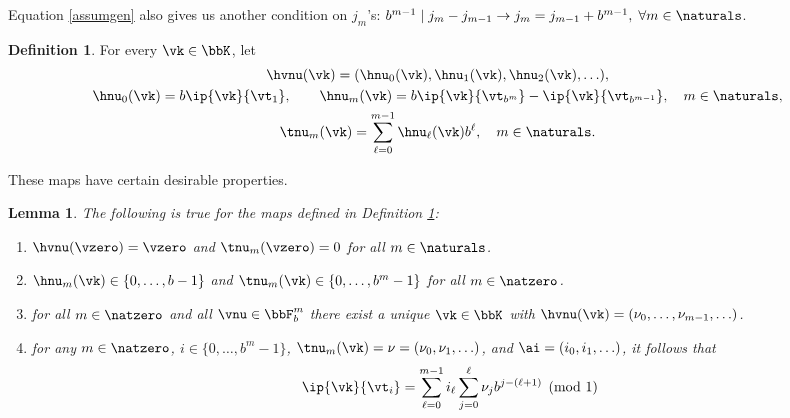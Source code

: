 \documentclass[]{elsarticle}
\newtheorem{lem}{Lemma}
\theoremstyle{definition}
\newtheorem{defin}{Definition}
\begin{document}
Equation \eqref{assumgen} also gives us another condition on $j_m$'s: $ b^{m-1} \mid j_m-j_{m-1}\rightarrow j_m=j_{m-1}+b^{m-1},\;\forall m\in\naturals$.

\begin{defin} \label{numapdef} For every $\vk \in \bbK$, let
\begin{subequations} \label{numapdefeq}
\begin{gather}
\hvnu(\vk)=(\hnu_0(\vk), \hnu_1(\vk), \hnu_2(\vk), \ldots ), \\
\hnu_0(\vk) = b\ip{\vk}{\vt_{1}}, \qquad \hnu_m(\vk)=b\ip{\vk}{\vt_{b^m}}-\ip{\vk}{\vt_{b^{m-1}}}, \quad m \in \naturals, \\
\tnu_m(\vk) = \sum_{\ell=0}^{m-1} \hnu_{\ell}(\vk) b^{\ell}, \quad m \in \naturals.
\end{gather}
\end{subequations}
\end{defin}

These maps have certain desirable properties.

\begin{lem} \label{numaplem} The following is true for the maps defined in Definition \ref{numapdef}:
\begin{enumerate}
\renewcommand{\labelenumi}{\alph{enumi})}

\item $\hvnu(\vzero)=\vzero$ and $\tnu_m(\vzero) = 0$ for all $m \in \naturals$.

\item $\hnu_m(\vk)\in \{0,\dots,b-1\}$ and $\tnu_m(\vk)\in \{0,\dots,b^m-1\}$ for all $m\in\natzero$.

\item for all $m\in \natzero$ and all $\vnu \in \bbF_b^{m}$ there exist a unique $\vk \in \bbK$ with $\hvnu(\vk)=(\nu_0, \ldots, \nu_{m-1}, \ldots)$.
    
\item for any $m \in \natzero$, $i \in \{0, \ldots, b^m-1\}$,  $\tnu_m(\vk)=\nu=(\nu_0, \nu_1, \ldots)$, and $\ai=(i_0, i_1, \ldots)$, it follows that
\begin{equation} \label{nuwisum}
\ip{\vk}{\vt_i} = \sum_{\ell=0}^{m-1} i_\ell \sum_{j=0}^{\ell} \nu_jb^{j-(\ell+1)} \pmod 1 
\end{equation}

\end{enumerate}
\end{lem}
\end{document}
